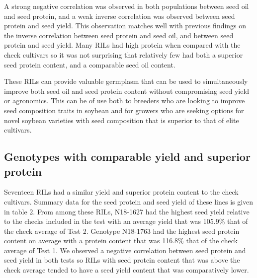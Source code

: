 \documentclass[Agronomy,article,submit,moreauthors,pdftex]{mdpi}
\begin{document}
A strong negative correlation was observed in both populations between
seed oil and seed protein, and a weak inverse correlation was observed
between seed protein and seed yield. This observation matches well with
previous findings on the inverse correlation between seed protein and
seed oil, and between seed protein and seed yield. Many RILs had high
protein when compared with the check cultivars so it was not surprising
that relatively few had both a superior seed protein content, and a
comparable seed oil content.

These RILs can provide valuable germplasm that can be used to
simultaneously improve both seed oil and seed protein content without
compromising seed yield or agronomics. This can be of use both to
breeders who are looking to improve seed composition traits in soybean
and for growers who are seeking options for novel soybean varieties with
seed composition that is superior to that of elite cultivars.

\hypertarget{genotypes-with-comparable-yield-and-superior-protein}{%
\subsection{Genotypes with comparable yield and superior
protein}\label{genotypes-with-comparable-yield-and-superior-protein}}

Seventeen RILs had a similar yield and superior protein content to the
check cultivars. Summary data for the seed protein and seed yield of
these lines is given in table 2. From among these RILs, N18-1627 had the
highest seed yield relative to the checks included in the test with an
average yield that was 105.9\% that of the check average of Test 2.
Genotype N18-1763 had the highest seed protein content on average with a
protein content that was 116.8\% that of the check average of Test 1. We
observed a negative correlation between seed protein and seed yield in
both tests so RILs with seed protein content that was above the check
average tended to have a seed yield content that was comparatively
lower.
\end{document}
